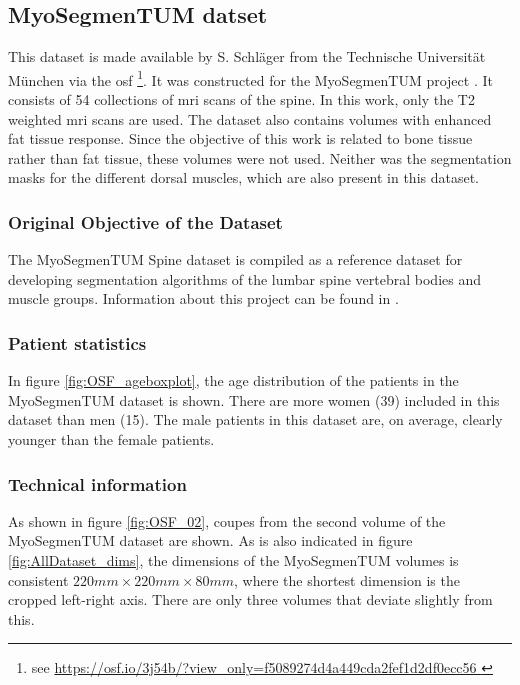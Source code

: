 \subsection{MyoSegmenTUM datset}

This dataset is made available by S. Schläger from the Technische Universität München via the \acrfull{osf} \footnote{see \url{ https://osf.io/3j54b/?view_only=f5089274d4a449cda2fef1d2df0ecc56 }}.
It was constructed for the MyoSegmenTUM project \cite{Durian2019}.
It consists of 54 collections of \acrshort{mri} scans of the spine.
In this work, only the T2 weighted \acrlong{mri} scans are used.
The dataset also contains volumes with enhanced fat tissue response. Since the objective of this work is related to bone tissue rather than fat tissue, these volumes were not used.
Neither was the segmentation masks for the different dorsal muscles, which are also present in this dataset.

\subsubsection{Original Objective of the Dataset}

The MyoSegmenTUM Spine dataset is compiled as a reference dataset for developing segmentation algorithms of the lumbar spine vertebral bodies and muscle groups.
Information about this project can be found in \cite{Durian2019}.

\subsubsection{Patient statistics}

In figure \ref{fig:OSF_ageboxplot}, the age distribution of the patients in the MyoSegmenTUM dataset is shown.
There are more women (39) included in this dataset than men (15).
The male patients in this dataset are, on average, clearly younger than the female patients.



\subsubsection{Technical information}

As shown in figure \ref{fig:OSF_02}, coupes from the second volume of the MyoSegmenTUM dataset are shown.
As is also indicated in figure \ref{fig:AllDataset_dims}, the dimensions of the MyoSegmenTUM volumes is consistent $220 mm \times 220 mm \times 80 mm$, where the shortest dimension is the cropped left-right axis.
There are only three volumes that deviate slightly from this.

